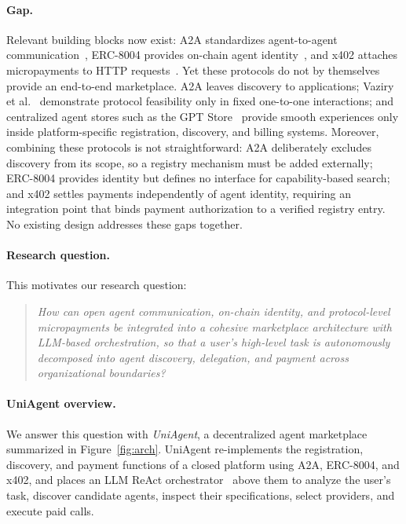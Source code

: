 \documentclass[sigconf]{acmart}
\begin{document}
\paragraph{Gap.}
Relevant building blocks now exist: A2A standardizes agent-to-agent
communication~\cite{a2a2025}, ERC-8004 provides on-chain agent
identity~\cite{erc8004}, and x402 attaches micropayments to HTTP
requests~\cite{x402whitepaper}. Yet these protocols do not by themselves
provide an end-to-end marketplace. A2A leaves discovery to applications;
Vaziry et al.~\cite{vaziry2025} demonstrate protocol feasibility only in
fixed one-to-one interactions; and centralized agent stores such as the
GPT Store~\cite{gptstore} provide smooth experiences only inside
platform-specific registration, discovery, and billing systems.
Moreover, combining these protocols is not straightforward: A2A
deliberately excludes discovery from its scope, so a registry mechanism
must be added externally; ERC-8004 provides identity but defines no
interface for capability-based search; and x402 settles payments
independently of agent identity, requiring an integration point that
binds payment authorization to a verified registry entry. No existing
design addresses these gaps together.

\paragraph{Research question.}
This motivates our research question:
\begin{quote}
\itshape How can open agent communication, on-chain identity, and
protocol-level micropayments be integrated into a cohesive marketplace
architecture with LLM-based orchestration, so that a user's high-level
task is autonomously decomposed into agent discovery, delegation, and
payment across organizational boundaries?
\end{quote}

\paragraph{UniAgent overview.}
We answer this question with \emph{UniAgent}, a decentralized agent
marketplace summarized in Figure~\ref{fig:arch}. UniAgent re-implements
the registration, discovery, and payment functions of a closed platform
using A2A, ERC-8004, and x402, and places an LLM ReAct
orchestrator~\cite{yao2023react} above them to analyze the user's task,
discover candidate agents, inspect their specifications, select
providers, and execute paid calls.
\end{document}
